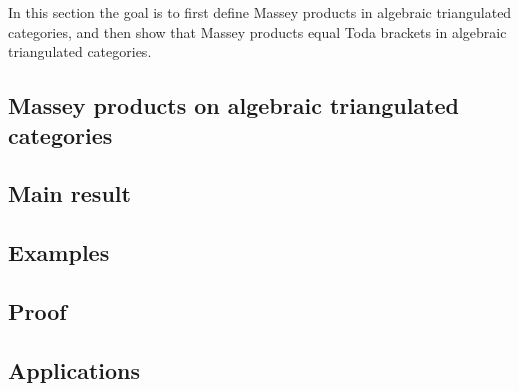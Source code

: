 In this section the goal is to first define Massey products in algebraic triangulated categories, and then show that Massey products equal Toda brackets in algebraic triangulated categories.

\subsection{Massey products on algebraic triangulated categories}


\subsection{Main result}


\subsection{Examples}


\subsection{Proof}


\subsection{Applications}
